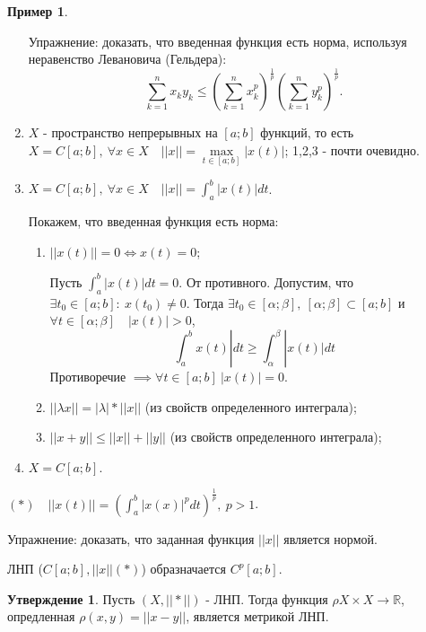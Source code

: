 \documentclass{report}
\theoremstyle{definition}
\newtheorem{example}{Пример}
\newtheorem{statement}{Утверждение}[section]
\begin{document}
\begin{example}
\begin{enumerate}
          Упражнение: доказать, что введенная функция есть норма, используя неравенство Левановича (Гельдера):
          \begin{equation*}
            \sum_{k=1}^{n}x_k y_k \leqslant (\sum_{k=1}^{n}x_k^p)^\frac{1}{p} (\sum_{k=1}^{n}y_k^p)^\frac{1}{p}.
          \end{equation*}

    \item $X$ - пространство непрерывных на $[a;b]$ функций, то есть $X = C[a;b], \ \forall x \in X
            \quad ||x|| = \underset{t \in [a;b]}{\max}|x(t)|$; 1,2,3 - почти очевидно.

    \item $X = C[a;b], \ \forall x \in X \quad ||x|| = \int_{a}^{b}|x(t)|dt$.

          Покажем, что введенная функция есть норма:
          \begin{enumerate}
            \item $||x(t)|| = 0 \iff x(t) = 0$;

                  Пусть $\int_{a}^{b}|x(t)|dt = 0$. От противного. Допустим, что $\exists t_0 \in [a;b]: \ x(t_0) \ne 0$.
                  Тогда $\exists t_0 \in [\alpha;\beta], \ [\alpha;\beta] \subset [a;b]$ и $\forall t \in [\alpha;\beta]
                    \quad |x(t)| > 0$,
                  \begin{equation*}
                    \int_{a}^{b}x(t)|dt \geqslant \int_{\alpha}^{\beta}|x(t)|dt
                  \end{equation*}
                  Противоречие $\implies \forall t \in [a;b] \ |x(t)| = 0$.

            \item $|| \lambda x || = | \lambda | * || x ||$ (из свойств определенного интеграла);
            \item $|| x+y || \leqslant || x || + || y ||$ (из свойств определенного интеграла);
          \end{enumerate}
    \item $X = C[a;b]$.
  \end{enumerate}
\end{example}

$(*) \quad || x(t) || = (\int_{a}^{b}|x(x)|^pdt)^\frac{1}{p}, \ p > 1$.

Упражнение: доказать, что заданная функция $|| x ||$ является нормой.

ЛНП ($C[a;b], || x || (*)$) образначается $C^p[a;b]$.

\begin{statement}
  Пусть $(X,|| * ||)$ - ЛНП. Тогда функция $\rho X \times X \rightarrow \mathbb{R}$, опредленная $\rho(x,y)
    = || x-y ||$, является метрикой ЛНП.
\end{statement}
\end{document}
